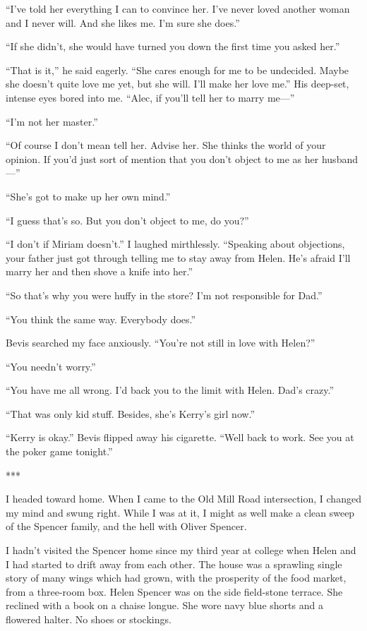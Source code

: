 \documentclass{novel}
\begin{document}
{“I’ve told her everything I can to convince her. I’ve never loved another woman and I never will. And she likes me. I’m sure she does.”

“If she didn’t, she would have turned you down the first time you asked her.”

“That is it,” he said eagerly. “She cares enough for me to be undecided. Maybe she doesn’t quite love me yet, but she will. I’ll make her love me.” His deep-set, intense eyes bored into me. “Alec, if you’ll tell her to marry me—”

“I’m not her master.”

“Of course I don’t mean tell her. Advise her. She thinks the world of your opinion. If you’d just sort of mention that you don’t object to me as her husband—”

“She’s got to make up her own mind.”

“I guess that’s so. But you don’t object to me, do you?”

“I don’t if Miriam doesn’t.” I laughed mirthlessly. “Speaking about objections, your father just got through telling me to stay away from Helen. He’s afraid I’ll marry her and then shove a knife into her.”

“So that’s why you were huffy in the store? I’m not responsible for Dad.”

“You think the same way. Everybody does.”

Bevis searched my face anxiously. “You’re not still in love with Helen?”

“You needn’t worry.”

“You have me all wrong. I’d back you to the limit with Helen. Dad’s crazy.”

“That was only kid stuff. Besides, she’s Kerry’s girl now.”

“Kerry is okay.” Bevis flipped away his cigarette. “Well back to work. See you at the poker game tonight.”

***

I headed toward home. When I came to the Old Mill Road intersection, I changed my mind and swung right. While I was at it, I might as well make a clean sweep of the Spencer family, and the hell with Oliver Spencer.

I hadn’t visited the Spencer home since my third year at college when Helen and I had started to drift away from each other. The house was a sprawling single story of many wings which had grown, with the prosperity of the food market, from a three-room box. Helen Spencer was on the side field-stone terrace. She reclined with a book on a chaise longue. She wore navy blue shorts and a flowered halter. No shoes or stockings.

}
\end{document}
